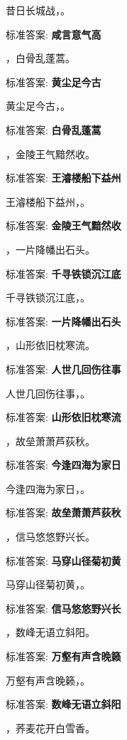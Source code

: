 \documentclass[12pt, a4paper, addpoints]{exam}
\begin{document}
\begin{questions}
\question[1] 昔日长城战，\uline{\qquad\qquad\qquad}。

标准答案: \textbf{咸言意气高}

\question[1] \uline{\qquad\qquad\qquad}，白骨乱蓬蒿。

标准答案: \textbf{黄尘足今古}

\question[1] 黄尘足今古，\uline{\qquad\qquad\qquad}。

标准答案: \textbf{白骨乱蓬蒿}

\question[1] \uline{\qquad\qquad\qquad}，金陵王气黯然收。

标准答案: \textbf{王濬楼船下益州}

\question[1] 王濬楼船下益州，\uline{\qquad\qquad\qquad}。

标准答案: \textbf{金陵王气黯然收}

\question[1] \uline{\qquad\qquad\qquad}，一片降幡出石头。

标准答案: \textbf{千寻铁锁沉江底}

\question[1] 千寻铁锁沉江底，\uline{\qquad\qquad\qquad}。

标准答案: \textbf{一片降幡出石头}

\question[1] \uline{\qquad\qquad\qquad}，山形依旧枕寒流。

标准答案: \textbf{人世几回伤往事}

\question[1] 人世几回伤往事，\uline{\qquad\qquad\qquad}。

标准答案: \textbf{山形依旧枕寒流}

\question[1] \uline{\qquad\qquad\qquad}，故垒萧萧芦荻秋。

标准答案: \textbf{今逢四海为家日}

\question[1] 今逢四海为家日，\uline{\qquad\qquad\qquad}。

标准答案: \textbf{故垒萧萧芦荻秋}

\question[1] \uline{\qquad\qquad\qquad}，信马悠悠野兴长。

标准答案: \textbf{马穿山径菊初黄}

\question[1] 马穿山径菊初黄，\uline{\qquad\qquad\qquad}。

标准答案: \textbf{信马悠悠野兴长}

\question[1] \uline{\qquad\qquad\qquad}，数峰无语立斜阳。

标准答案: \textbf{万壑有声含晚籁}

\question[1] 万壑有声含晚籁，\uline{\qquad\qquad\qquad}。

标准答案: \textbf{数峰无语立斜阳}

\question[1] \uline{\qquad\qquad\qquad}，荞麦花开白雪香。


\end{questions}
\end{document}

